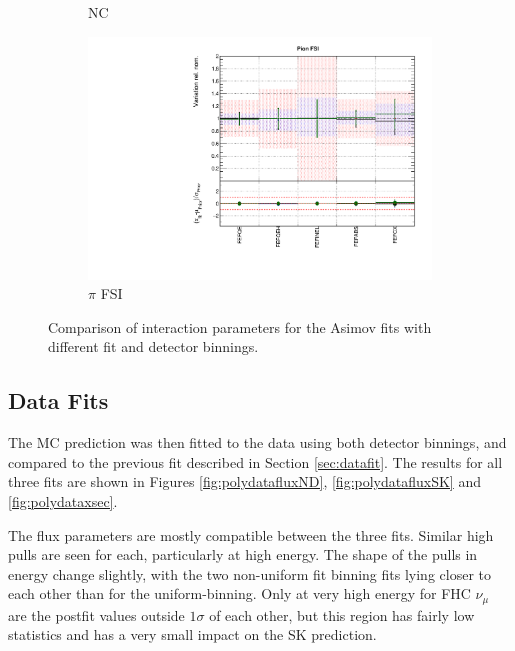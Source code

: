 \begin{figure}
\begin{subfigure}{0.49\textwidth}
  \caption{NC}
\end{subfigure}
\begin{subfigure}{0.49\textwidth}
  \centering
  \includegraphics[width=0.9\linewidth]{figs/polyasmvsxsec_5}
  \caption{$\pi$ FSI}
\end{subfigure}
\caption{Comparison of interaction parameters for the Asimov fits with different fit and detector binnings.}
\label{fig:polyasmvsxsec}
\end{figure}

\subsection{Data Fits}

The MC prediction was then fitted to the data using both detector binnings, and compared to the previous fit described in Section \ref{sec:datafit}. The results for all three fits are shown in Figures \ref{fig:polydatafluxND}, \ref{fig:polydatafluxSK} and \ref{fig:polydataxsec}. 

The flux parameters are mostly compatible between the three fits. Similar high pulls are seen for each, particularly at high energy. The shape of the pulls in energy change slightly, with the two non-uniform fit binning fits lying closer to each other than for the uniform-binning. Only at very high energy for FHC $\nu_{\mu}$ are the postfit values outside $1\sigma$ of each other, but this region has fairly low statistics and has a very small impact on the SK prediction.

